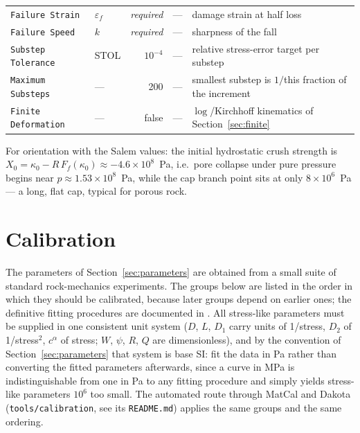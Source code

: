 \documentclass[12pt]{article}
\begin{document}
\begin{center}
\begin{tabular}{llrlp{5.4cm}}
\texttt{Failure Strain}     & $\varepsilon_f$ & \emph{required} & --- & damage strain at half loss \\
\texttt{Failure Speed}      & $k$  & \emph{required} & --- & sharpness of the fall \\
\midrule
\texttt{Substep Tolerance} & STOL & $10^{-4}$ & --- &
  relative stress-error target per substep \\
\texttt{Maximum Substeps}  & ---  & 200 & --- &
  smallest substep is $1/$this fraction of the increment \\
\texttt{Finite Deformation} & --- & false & --- &
  $\log$/Kirchhoff kinematics of Section~\ref{sec:finite} \\
\bottomrule
\end{tabular}
\end{center}

For orientation with the Salem values: the initial hydrostatic crush
strength is
$X_0 = \kappa_0 - R\,F_f(\kappa_0) \approx -4.6 \times 10^{8}$~Pa,
i.e.\ pore collapse under pure pressure begins near
$p \approx 1.53 \times 10^{8}$~Pa, while the cap branch point sits at
only $8 \times 10^{6}$~Pa --- a long, flat cap, typical for porous
rock.

\section{Calibration}
\label{sec:calibration}

The parameters of Section~\ref{sec:parameters} are obtained from a
small suite of standard rock-mechanics experiments. The groups below
are listed in the order in which they should be calibrated, because
later groups depend on earlier ones; the definitive fitting
procedures are documented in \citet[Section~4]{Fossum.Brannon:2004}.
All stress-like parameters must be supplied in one consistent unit
system ($D$, $L$, $D_1$ carry units of 1/stress, $D_2$ of
1/stress$^2$, $c^\alpha$ of stress; $W$, $\psi$, $R$, $Q$ are
dimensionless), and by the convention of
Section~\ref{sec:parameters} that system is base SI: fit the data in
Pa rather than converting the fitted parameters afterwards, since a
curve in MPa is indistinguishable from one in Pa to any fitting
procedure and simply yields stress-like parameters $10^{6}$ too
small. The automated route through MatCal and Dakota
(\texttt{tools/calibration}, see its \texttt{README.md}) applies the
same groups and the same ordering.
\end{document}
